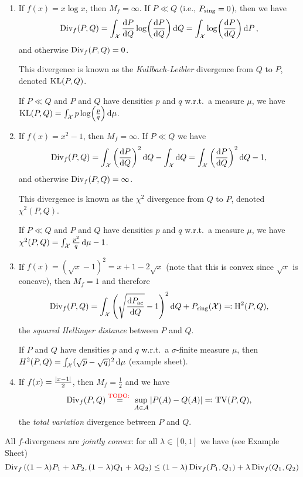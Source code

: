 \begin{example}
	\begin{enumerate}
		\item If $f(x) = x\log x$, then $M_f = \infty$. If $P \ll Q$ (i.e., $P_\mathrm{sing} = 0$), then we have
		\[
		\operatorname{Div}_f(P, Q) = \int_\mathcal X  \dv{P}{Q} \log(\dv{P}{Q}) \dd{Q} = \int_\mathcal X \log(\dv{P}{Q}) \dd{P},
		\]
		and otherwise $\operatorname{Div}_f(P, Q) = 0$.
		
		This divergence is known as the \emph{Kullbach-Leibler} divergence from $Q$ to $P$, denoted $\operatorname{KL}(P, Q)$. 
		
		If $P \ll Q$ and $P$ and $Q$ have densities $p$ and $q$ w.r.t.\ a  measure $\mu$, we have $\operatorname{KL}(P, Q) = \int_\mathcal X p \log(\frac pq) \dd{\mu}$. 
		
		\item If $f(x) = x^2 - 1$, then $M_f = \infty$. If $P \ll Q$ we have
		\[
		\operatorname{Div}_f(P, Q) = \int_\mathcal X \qty(\dv{P}{Q})^2 \dd{Q} - \int_\mathcal X \dd{Q} = \int_\mathcal X \qty(\dv{P}{Q})^2 \dd{Q} - 1, 
		\]
		and otherwise $\operatorname{Div}_f(P, Q) = \infty$. 
		
		This divergence is known as the $\chi^2$ divergence from $Q$ to $P$, denoted $\chi^2(P, Q)$. 
		
		If $P \ll Q$ and  $P$ and $Q$ have densities $p$ and $q$ w.r.t.\ a measure $\mu$, we have $\chi^2(P, Q) = \int_\mathcal X \frac{p^2}{q} \dd{\mu} - 1$.
		
		\item If $f(x) = (\sqrt x - 1)^2 = x + 1 - 2\sqrt x$ (note that this is convex since $\sqrt x$ is concave), then $M_f = 1$ and therefore
		\[
		\operatorname{Div}_f(P, Q) = \int_\mathcal X \qty(\sqrt{\dv{P_\mathrm{ac}}{Q}} - 1)^2 \dd{Q} + P_\mathrm{sing}(\mathcal X) \eqqcolon \operatorname{H}^2(P, Q),
		\]
		the \emph{squared Hellinger distance} between $P$ and $Q$. 
		
		If $P$ and $Q$ have densities $p$ and $q$ w.r.t.\ a $\sigma$-finite measure $\mu$, then $H^2(P, Q) = \int_\mathcal X (\sqrt p - \sqrt q)^2 \dd{\mu}$ (example sheet). 
		
		\item If $f(x) = \frac{\abs{x-1}}{2}$, then $M_f = \frac12$ and we have
		\begin{align*}
			\operatorname{Div}_f(P, Q) \overset{\text{{\color{red} TODO: }}}{=} \sup_{A \in \mathcal A} \abs{P(A) - Q(A)} \eqqcolon \operatorname{TV}(P, Q),
		\end{align*}
	the \emph{total variation} divergence between $P$ and $Q$. 
	\end{enumerate}
\end{example}

All $f$-divergences are \emph{jointly convex}: for all $\lambda \in [0, 1]$ we have (see Example Sheet)
\[
\operatorname{Div}_f\qty((1 - \lambda) P_1 + \lambda P_2, (1 - \lambda) Q_1 + \lambda Q_2) \leq (1-\lambda) \operatorname{Div}_f(P_1, Q_1) + \lambda \operatorname{Div}_f(Q_1, Q_2)
\]

